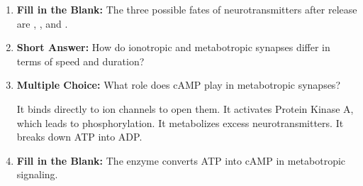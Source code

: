 \begin{enumerate}[label=\textbf{Q2.3.\arabic*}]
      \item \textbf{Fill in the Blank:} The three possible fates of neurotransmitters after release are \underline{\hspace{3cm}}, \underline{\hspace{3cm}}, and \underline{\hspace{3cm}}. \\

      \item \textbf{Short Answer:} How do ionotropic and metabotropic synapses differ in terms of speed and duration? \\

      \item \textbf{Multiple Choice:} What role does cAMP play in metabotropic synapses?
            \begin{tasks}
                  \task It binds directly to ion channels to open them.
                  \task It activates Protein Kinase A, which leads to phosphorylation.
                  \task It metabolizes excess neurotransmitters.
                  \task It breaks down ATP into ADP.
            \end{tasks}

      \item \textbf{Fill in the Blank:} The enzyme \underline{\hspace{3cm}} converts ATP into cAMP in metabotropic signaling. \\

\end{enumerate}
